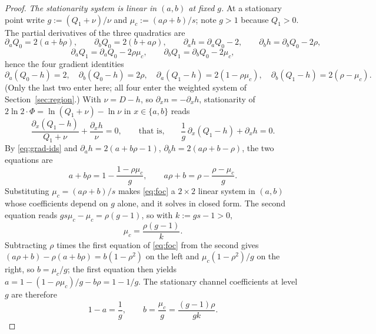 ﻿\documentclass[11pt,onecolumn]{IEEEtran}
\begin{document}
\begin{proof}
\emph{The stationarity system is linear in $(a,b)$ at fixed $g$.} At a
stationary point write $g:=(Q_1+\nu)/\nu$ and $\mu_c:=(a\rho+b)/s$; note
$g>1$ because $Q_1>0$. The partial derivatives of the three quadratics
are
\[
\partial_aQ_0=2(a+b\rho),\qquad
\partial_bQ_0=2(b+a\rho),\qquad
\partial_ah=\partial_aQ_0-2,\qquad
\partial_bh=\partial_bQ_0-2\rho,
\]
\[
\partial_aQ_1=\partial_aQ_0-2\rho\mu_c,\qquad
\partial_bQ_1=\partial_bQ_0-2\mu_c,
\]
hence the four gradient identities
\begin{equation}
\partial_a(Q_0-h)=2,\quad
\partial_b(Q_0-h)=2\rho,\quad
\partial_a(Q_1-h)=2(1-\rho\mu_c),\quad
\partial_b(Q_1-h)=2(\rho-\mu_c).
\label{eq:grad-ids}
\end{equation}
(Only the last two enter here; all four enter the weighted system of
Section~\ref{sec:region}.) With $\nu=D-h$, so
$\partial_xn=-\partial_xh$, stationarity of
$2\ln2\cdot\Phi=\ln(Q_1+\nu)-\ln \nu$ in $x\in\{a,b\}$ reads
\[
\frac{\partial_x(Q_1-h)}{Q_1+\nu}+\frac{\partial_xh}{\nu}=0,
\qquad\text{that is,}\qquad
\frac1g\,\partial_x(Q_1-h)+\partial_xh=0 .
\]
By \eqref{eq:grad-ids} and
$\partial_ah=2(a+b\rho-1)$, $\partial_bh=2(a\rho+b-\rho)$, the two
equations are
\begin{equation}
a+b\rho=1-\frac{1-\rho\mu_c}{g},
\qquad
a\rho+b=\rho-\frac{\rho-\mu_c}{g} .
\label{eq:foc}
\end{equation}
Substituting $\mu_c=(a\rho+b)/s$ makes \eqref{eq:foc} a $2\times2$
linear system in $(a,b)$ whose coefficients depend on $g$ alone, and it
solves in closed form. The second equation reads
$gs\mu_c-\mu_c=\rho(g-1)$, so with $k:=gs-1>0$,
\begin{equation}
\mu_c=\frac{\rho(g-1)}{k} .
\label{eq:mu}
\end{equation}
Subtracting $\rho$ times the first equation of \eqref{eq:foc} from the
second gives
$(a\rho+b)-\rho(a+b\rho)=b(1-\rho^2)$ on the left and
$\mu_c(1-\rho^2)/g$ on the right, so $b=\mu_c/g$; the first equation
then yields $a=1-(1-\rho\mu_c)/g-b\rho=1-1/g$. The stationary channel
coefficients at level $g$ are therefore
\begin{equation}
1-a=\frac1g,
\qquad
b=\frac{\mu_c}{g}=\frac{(g-1)\rho}{gk} .
\label{eq:ab}
\end{equation}


\end{proof}
\end{document}
